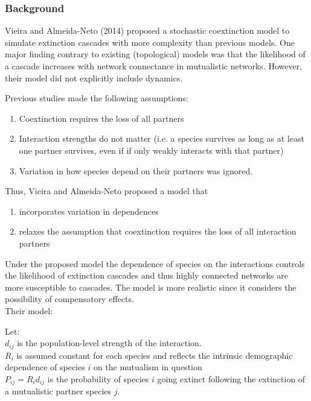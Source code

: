 \documentclass[12pt]{article}
\begin{document}
\subsubsection*{Background}
Vieira and Almeida-Neto (2014) proposed a stochastic coextinction model to simulate extinction cascades with more complexity than previous models. One major finding contrary to existing (topological) models was that the likelihood of a cascade increases with network connectance in mutualistic networks. However, their model did not explicitly include dynamics. %

Previous studies made the following assumptions:
\begin{enumerate}
	\item Coextinction requires the loss of all partners
	\item Interaction strengths do not matter (i.e. a species survives as long as at least one partner survives, even if if only weakly interacts with that partner)
	\item Variation in how species depend on their partners was ignored. %
\end{enumerate}

Thus, Vieira and Almeida-Neto proposed a model that
\begin{enumerate}
	\item incorporates variation in dependences
	\item relaxes the assumption that coextinction requires the loss of all interaction partners
\end{enumerate}

Under the proposed model the dependence of species on the interactions controls the likelihood of extinction cascades and thus highly connected networks are more susceptible to cascades. The model is more realistic since it considers the possibility of compensatory effects.\\

Their model:

Let:\\
$d_{ij}$ is the population-level strength of the interaction.\\
$R_i$ is assumed constant for each species and reflects the intrinsic demographic dependence of species $i$ on the mutualism in question\\
$P_{ij} = R_i d_{ij}$ is the probability of species $i$ going extinct following the extinction of a mutualistic partner species $j$.\\
\end{document}
